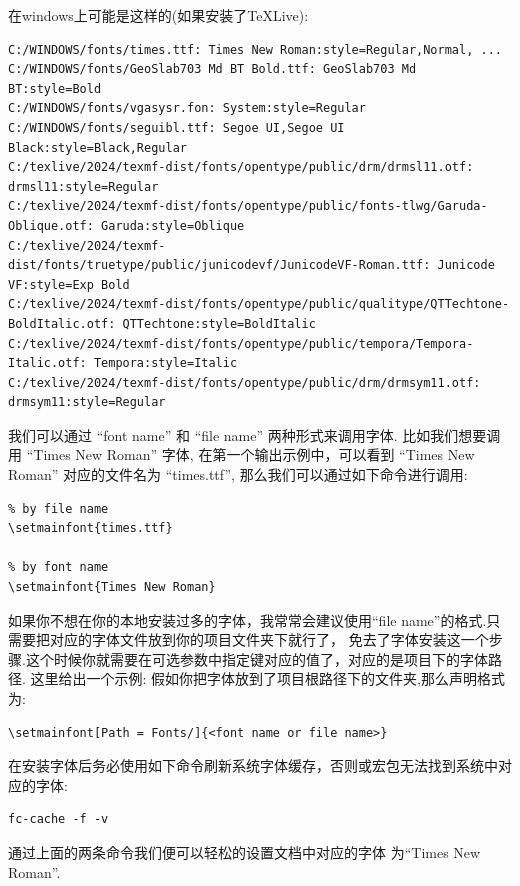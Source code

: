 在windows上可能是这样的(如果安装了\TeX{}Live):
\begin{verbatim}
C:/WINDOWS/fonts/times.ttf: Times New Roman:style=Regular,Normal, ...
C:/WINDOWS/fonts/GeoSlab703 Md BT Bold.ttf: GeoSlab703 Md BT:style=Bold
C:/WINDOWS/fonts/vgasysr.fon: System:style=Regular
C:/WINDOWS/fonts/seguibl.ttf: Segoe UI,Segoe UI Black:style=Black,Regular
C:/texlive/2024/texmf-dist/fonts/opentype/public/drm/drmsl11.otf: drmsl11:style=Regular
C:/texlive/2024/texmf-dist/fonts/opentype/public/fonts-tlwg/Garuda-Oblique.otf: Garuda:style=Oblique
C:/texlive/2024/texmf-dist/fonts/truetype/public/junicodevf/JunicodeVF-Roman.ttf: Junicode VF:style=Exp Bold
C:/texlive/2024/texmf-dist/fonts/opentype/public/qualitype/QTTechtone-BoldItalic.otf: QTTechtone:style=BoldItalic
C:/texlive/2024/texmf-dist/fonts/opentype/public/tempora/Tempora-Italic.otf: Tempora:style=Italic
C:/texlive/2024/texmf-dist/fonts/opentype/public/drm/drmsym11.otf: drmsym11:style=Regular
\end{verbatim}

我们可以通过 ``font name'' 和  ``file name'' 两种形式来调用字体. 比如我们想要调用 ``Times New Roman'' 字体,
在第一个输出示例中，可以看到 ``Times New Roman'' 对应的文件名为 ``times.ttf'', 那么我们可以通过如下命令进行调用:
\begin{verbatim}
% by file name 
\setmainfont{times.ttf}

% by font name
\setmainfont{Times New Roman}
\end{verbatim}

\begin{leftbar}
如果你不想在你的本地安装过多的字体，我常常会建议使用``file name''的格式.只需要把对应的字体文件放到你的项目文件夹下就行了，
免去了字体安装这一个步骤.这个时候你就需要在可选参数中指定键对应的值了，对应的是项目下的字体路径. 这里给出一个示例:
假如你把字体放到了项目根路径下的文件夹,那么声明格式为:
\end{leftbar}
\begin{verbatim}
\setmainfont[Path = Fonts/]{<font name or file name>}
\end{verbatim}

在安装字体后务必使用如下命令刷新系统字体缓存，否则或宏包无法找到系统中对应的字体:
\begin{verbatim}
fc-cache -f -v
\end{verbatim}

通过上面的两条命令我们便可以轻松的设置文档中对应的字体
为``Times New Roman''.

